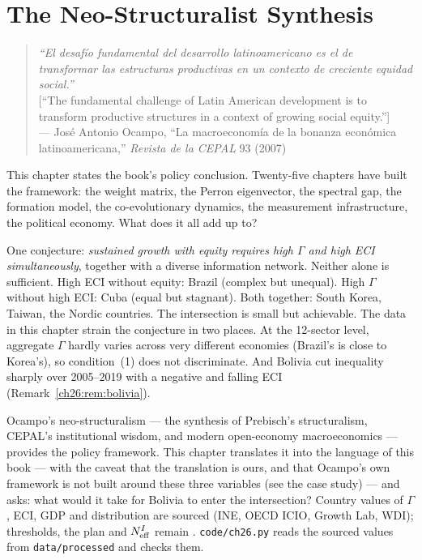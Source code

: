 \documentclass[../structural_economics_book.tex]{subfiles}
\begin{document}
\ifSubfilesClassLoaded{\setcounter{chapter}{25}}{}
\chapter{The Neo-Structuralist Synthesis}\label{ch:26}
\begin{quote}
\textit{``El desaf\'{i}o fundamental del desarrollo latinoamericano es el de transformar las estructuras productivas en un contexto de creciente equidad social.''}\\[0.3em]
\textnormal{[``The fundamental challenge of Latin American development is to transform productive structures in a context of growing social equity.'']}\\
\hfill --- Jos\'{e} Antonio Ocampo, ``La macroeconom\'{i}a de la bonanza econ\'{o}mica latinoamericana,'' \textit{Revista de la CEPAL} 93 (2007)
\end{quote}
\nocite{ocampo2007macroeconomia}

\vspace{1em}

This chapter states the book's policy conclusion. Twenty-five chapters have built the framework: the weight matrix, the Perron eigenvector, the spectral gap, the formation model, the co-evolutionary dynamics, the measurement infrastructure, the political economy. What does it all add up to?

One conjecture: \textit{sustained growth with equity requires high $\Gamma$ and high ECI simultaneously}, together with a diverse information network. Neither alone is sufficient. High ECI without equity: Brazil (complex but unequal). High $\Gamma$ without high ECI: Cuba (equal but stagnant). Both together: South Korea, Taiwan, the Nordic countries. The intersection is small but achievable. The data in this chapter strain the conjecture in two places. At the 12-sector level, aggregate $\Gamma$ hardly varies across very different economies (Brazil's is close to Korea's), so condition~(1) does not discriminate. And Bolivia cut inequality sharply over 2005--2019 with a negative and falling ECI (Remark~\ref{ch26:rem:bolivia}).

Ocampo's neo-structuralism --- the synthesis of Prebisch's structuralism, CEPAL's institutional wisdom, and modern open-economy macroeconomics --- provides the policy framework. This chapter translates it into the language of this book --- with the caveat that the translation is ours, and that Ocampo's own framework is not built around these three variables (see the case study) --- and asks: what would it take for Bolivia to enter the intersection? Country values of $\Gamma$, ECI, GDP and distribution are sourced (INE, OECD ICIO, Growth Lab, WDI); thresholds, the plan and $N_{\text{eff}}^I$ remain \illustrative{}. \texttt{code/ch26.py} reads the sourced values from \texttt{data/processed} and checks them.
\end{document}
